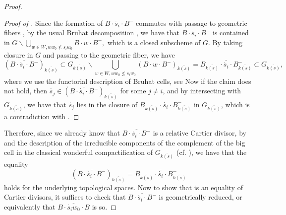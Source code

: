 \documentclass[11pt, reqno]{amsart}
\theoremstyle{plain}
\theoremstyle{definition}
\DeclareMathOperator{\Pic}{Pic}    %
\begin{document}
\begin{proof}
\begin{proof}[Proof of ]
    Since the formation of $B\cdot \dot{s_i} \cdot B^{-}$ commutes with passage to geometric fibers \cite[lemme~5.7.3 (i)]{SGA3II}, by the usual Bruhat decomposition \cite[8.5.4]{linearalgrpSpringer}, we have that $B\cdot \dot{s_i} \cdot B^-$ is contained in $ G\backslash \bigcup_{w\in W, ww_0\nleq s_iw_0} B\cdot w\cdot B^-,$ which is a closed subscheme of $G$. By taking closure in $G$ and passing to the geometric fiber, we have 
   $$(\overline{B \cdot \dot{s_i} \cdot B^-})_{\overline{k(s)}}\subset G_{\overline{k(s)}}\backslash \bigcup_{w\in W, ww_0\nleq s_iw_0} (B\cdot w\cdot B^-)_{\overline{k(s)}}=\overline{B_{\overline{k(s)}}\cdot \dot{s_i} \cdot B_{\overline{k(s)}}^-}\subset G_{\overline{k(s)}},$$
   where we use the functorial description of Bruhat cells, see \cite[exposé~XXII, lemme~5.7.3]{SGA3III}
   Now if the claim does not hold, then $\dot{s_j}\in (\overline{B \cdot \dot{s_i} \cdot B^-})_{\overline{k(s)}}$ for some $j\neq i$, and by intersecting with $G_{\overline{k(s)}}$, we have that $\dot{s_j}$ lies in the closure of $B_{\overline{k(s)}}\cdot \dot{s_i} \cdot B_{\overline{k(s)}}^-$ in $G_{\overline{k(s)}}$, which is a contradiction with \cite[8.5.4]{linearalgrpSpringer}.
\end{proof}
Therefore, since we already know that $\overline{B\cdot \dot{s_i} \cdot B^-}$ is a relative Cartier divisor, by  and the description of the irreducible components of the complement of the big cell in the classical wonderful compactification  of $G_{\overline{k(s)}}$ (cf. \cite[Lemma~6.1.9]{BrionKumar}), we have that the equality 
\begin{equation}\label{basechangeofboundarydivisor}
       (\overline{B\cdot \dot{s_i} \cdot B^-})_{\overline{k(s)}}=\overline{B_{\overline{k(s)}}\cdot \dot{s_i} \cdot B_{\overline{k(s)}}^-}
   \end{equation}
 holds for the underlying topological spaces.
Now to show that  is an equality of Cartier divisors, it suffices to check that $\overline{B\cdot \dot{s_i} \cdot B^-}$ is geometrically reduced, or equivalently that $\overline{B\cdot \dot{s_i}w_0 \cdot B}$ is so. 

\end{proof}
\end{document}
